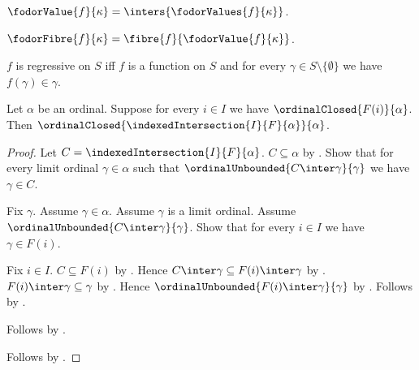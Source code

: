 \begin{definition}\label{fodor_value}
    $\fodorValue{f}{\kappa}=\inters{\fodorValues{f}{\kappa}}$.
\end{definition}

\begin{definition}\label{fodor_fibre}
    $\fodorFibre{f}{\kappa}=\fibre{f}{\fodorValue{f}{\kappa}}$.
\end{definition}

\begin{definition}\label{regressive_on}
    $f$ is regressive on $S$ iff $f$ is a function on $S$ and
        for every $\gamma\in S\setminus\{\emptyset\}$ we have
            $f(\gamma)\in\gamma$.
\end{definition}

\begin{proposition}\label{ordinal_closed_indexed_intersection}
    Let $\alpha$ be an ordinal.
    Suppose for every $i\in I$ we have
        $\ordinalClosed{F(i)}{\alpha}$.
    Then $\ordinalClosed{\indexedIntersection{I}{F}{\alpha}}{\alpha}$.
\end{proposition}
\begin{proof}
    Let $C=\indexedIntersection{I}{F}{\alpha}$.
    $C\subseteq\alpha$ by .
    Show that for every limit ordinal $\gamma\in\alpha$ such that
        $\ordinalUnbounded{C\inter\gamma}{\gamma}$
        we have $\gamma\in C$.
    \begin{subproof}
        Fix $\gamma$.
        Assume $\gamma\in\alpha$.
        Assume $\gamma$ is a limit ordinal.
        Assume $\ordinalUnbounded{C\inter\gamma}{\gamma}$.
        Show that for every $i\in I$ we have $\gamma\in F(i)$.
        \begin{subproof}
            Fix $i\in I$.
            $C\subseteq F(i)$
                by .
            Hence $C\inter\gamma\subseteq F(i)\inter\gamma$
                by .
            $F(i)\inter\gamma\subseteq\gamma$
                by .
            Hence $\ordinalUnbounded{F(i)\inter\gamma}{\gamma}$
                by .
            Follows by .
        \end{subproof}
        Follows by .
    \end{subproof}
    Follows by .
\end{proof}

